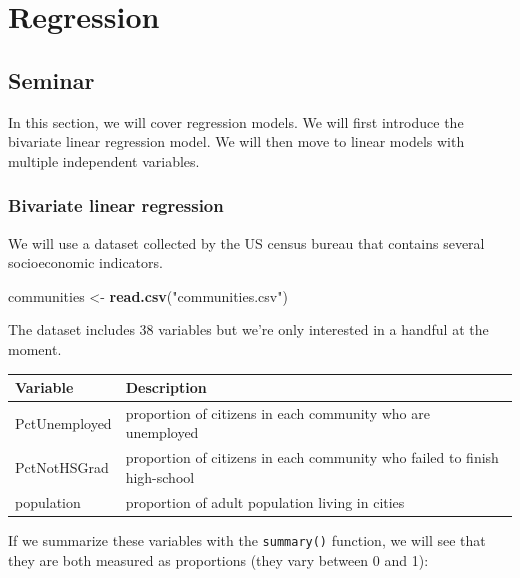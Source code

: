 \documentclass[]{article}
\newenvironment{Shaded}{\begin{snugshade}}{\end{snugshade}}
\newcommand{\KeywordTok}[1]{\textcolor[rgb]{0.13,0.29,0.53}{\textbf{#1}}}
\newcommand{\NormalTok}[1]{#1}
\newcommand{\OperatorTok}[1]{\textcolor[rgb]{0.81,0.36,0.00}{\textbf{#1}}}
\newcommand{\StringTok}[1]{\textcolor[rgb]{0.31,0.60,0.02}{#1}}
\begin{document}
\hypertarget{regression}{%
\section{Regression}\label{regression}}

\hypertarget{seminar-5}{%
\subsection{Seminar}\label{seminar-5}}

In this section, we will cover regression models. We will first introduce the bivariate linear regression model. We will then move to linear models with multiple independent variables.

\hypertarget{bivariate-linear-regression}{%
\subsubsection{Bivariate linear regression}\label{bivariate-linear-regression}}

We will use a dataset collected by the US census bureau that contains several socioeconomic indicators.

\begin{Shaded}
\begin{Highlighting}[]
\NormalTok{communities <-}\StringTok{ }\KeywordTok{read.csv}\NormalTok{(}\StringTok{"communities.csv"}\NormalTok{)}
\end{Highlighting}
\end{Shaded}

The dataset includes 38 variables but we're only interested in a handful at the moment.

\begin{tabular}{l|l}
\hline
Variable & Description\\
\hline
PctUnemployed & proportion of citizens in each community who are unemployed\\
\hline
PctNotHSGrad & proportion of citizens in each community who failed to finish high-school\\
\hline
population & proportion of adult population living in cities\\
\hline
\end{tabular}

If we summarize these variables with the \texttt{summary()} function, we will see that they are both measured as proportions (they vary between 0 and 1):

\begin{Shaded}
\end{Shaded}
\end{document}

